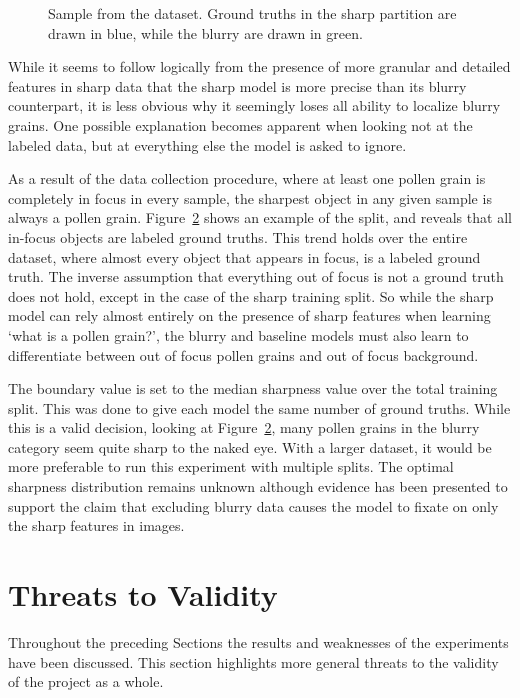 \begin{figure}[htbp]
\begin{subfigure}[t]{0.35\textwidth}
    \label{fig:results-sharpness-blurry}
  \end{subfigure}
  \caption[Data sample showing split between sharp and blurry data]{%
Sample from the dataset. Ground truths in the sharp partition are drawn in \textcolor{poaceae}{blue}, while the blurry are drawn in \textcolor{alnus}{green}.
  }\label{fig:results-sharp-gt}
\end{figure}

While it seems to follow logically from the presence of more granular and detailed features in sharp data that the sharp model is more precise than its blurry counterpart, it is less obvious why it seemingly loses all ability to localize blurry grains.
One possible explanation becomes apparent when looking not at the labeled data, but at everything else the model is asked to ignore.

As a result of the data collection procedure, where at least one pollen grain is completely in focus in every sample, the sharpest object in any given sample is always a pollen grain.
Figure~\ref{fig:results-sharp-gt} shows an example of the split, and reveals that all in-focus objects are labeled ground truths.
This trend holds over the entire dataset, where almost every object that appears in focus, is a labeled ground truth.
The inverse assumption that everything out of focus is not a ground truth does not hold, except in the case of the sharp training split.
So while the sharp model can rely almost entirely on the presence of sharp features when learning `what is a pollen grain?', the blurry and baseline models must also learn to differentiate between out of focus pollen grains and out of focus background.

The boundary value is set to the median sharpness value over the total training split.
This was done to give each model the same number of ground truths.
While this is a valid decision, looking at Figure~\ref{fig:results-sharp-gt}, many pollen grains in the blurry category seem quite sharp to the naked eye.
With a larger dataset, it would be more preferable to run this experiment with multiple splits.
The optimal sharpness distribution remains unknown although evidence has been presented to support the claim that excluding blurry data causes the model to fixate on only the sharp features in images.

\section{Threats to Validity}\label{sec:results-validity}
Throughout the preceding Sections the results and weaknesses of the experiments have been discussed.
This section highlights more general threats to the validity of the project as a whole.

